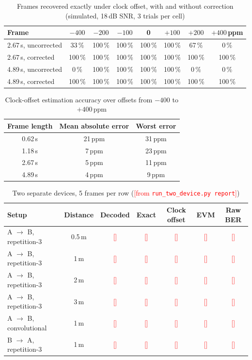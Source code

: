 \documentclass[11pt,a4paper]{report}
\newcommand{\fillin}[1]{\textcolor{red}{[#1]}}
\begin{document}
\begin{table}[htbp]
\centering
\small
\begin{tabular}{|l|c|c|c|c|c|c|c|}
\hline
\textbf{Frame} & $-400$ & $-200$ & $-100$ & 0 & $+100$ & $+200$ & $+400$\,ppm \\
\hline
2.67\,s, uncorrected & 33\,\% & 100\,\% & 100\,\% & 100\,\% & 100\,\% & 67\,\% & 0\,\% \\
2.67\,s, corrected & 100\,\% & 100\,\% & 100\,\% & 100\,\% & 100\,\% & 100\,\% & 100\,\% \\
4.89\,s, uncorrected & 0\,\% & 100\,\% & 100\,\% & 100\,\% & 100\,\% & 0\,\% & 0\,\% \\
4.89\,s, corrected & 100\,\% & 100\,\% & 100\,\% & 100\,\% & 100\,\% & 100\,\% & 100\,\% \\
\hline
\end{tabular}
\caption{Frames recovered exactly under clock offset, with and without correction
(simulated, 18\,dB SNR, 3 trials per cell)}
\end{table}

\begin{table}[htbp]
\centering
\small
\begin{tabular}{|c|c|c|}
\hline
\textbf{Frame length} & \textbf{Mean absolute error} & \textbf{Worst error} \\
\hline
0.62\,s & 21\,ppm & 31\,ppm \\
1.18\,s & 7\,ppm & 23\,ppm \\
2.67\,s & 5\,ppm & 11\,ppm \\
4.89\,s & 4\,ppm & 9\,ppm \\
\hline
\end{tabular}
\caption{Clock-offset estimation accuracy over offsets from $-400$ to $+400$\,ppm}
\end{table}

\begin{table}[htbp]
\centering
\small
\begin{tabular}{|l|c|c|c|c|c|c|}
\hline
\textbf{Setup} & \textbf{Distance} & \textbf{Decoded} & \textbf{Exact} & \textbf{Clock offset} & \textbf{EVM} & \textbf{Raw BER} \\
\hline
A $\rightarrow$ B, repetition-3 & 0.5\,m & \fillin{} & \fillin{} & \fillin{} & \fillin{} & \fillin{} \\
A $\rightarrow$ B, repetition-3 & 1\,m & \fillin{} & \fillin{} & \fillin{} & \fillin{} & \fillin{} \\
A $\rightarrow$ B, repetition-3 & 2\,m & \fillin{} & \fillin{} & \fillin{} & \fillin{} & \fillin{} \\
A $\rightarrow$ B, repetition-3 & 3\,m & \fillin{} & \fillin{} & \fillin{} & \fillin{} & \fillin{} \\
A $\rightarrow$ B, convolutional & 1\,m & \fillin{} & \fillin{} & \fillin{} & \fillin{} & \fillin{} \\
B $\rightarrow$ A, repetition-3 & 1\,m & \fillin{} & \fillin{} & \fillin{} & \fillin{} & \fillin{} \\
\hline
\end{tabular}
\caption{Two separate devices, 5 frames per row
(\fillin{from \texttt{run\_two\_device.py report}})}
\end{table}
\end{document}
